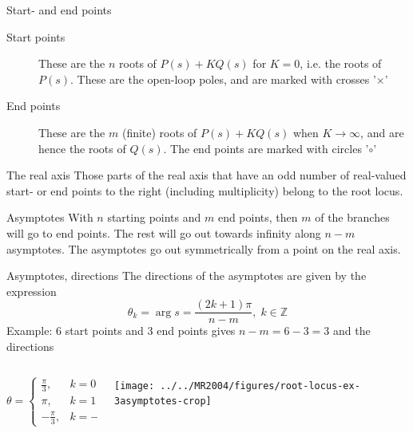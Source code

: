 \documentclass[presentation,aspectratio=169]{beamer}
\begin{document}
\begin{frame}[label={sec:orgf80e036}]{Start- and end points}
\begin{description}
\item[{Start points}] These are the \(n\) roots of \(P(s) + KQ(s)\) for \(K=0\), i.e. the roots of \(P(s)\). These are the open-loop poles, and are marked with crosses '\(\times\)'
\item[{End points}] These are the \(m\) (finite) roots of \(P(s)+KQ(s)\) when \(K\to\infty\), and are hence the roots of \(Q(s)\). The end points are marked with circles '\(\circ\)'
\end{description}
\end{frame}

\begin{frame}[label={sec:org398a233}]{The real axis}
Those parts of the real axis that have an \alert{odd number} of real-valued start- or end points to the right (including multiplicity) belong to the root locus. 
\end{frame}


\begin{frame}[label={sec:org8aa0f2f}]{Asymptotes}
With \(n\) starting points and \(m\) end points, then \(m\) of the branches will go to end points. The rest will go out towards infinity along \(n-m\) asymptotes. The asymptotes go out symmetrically from a point on the real axis. 
\end{frame}


\begin{frame}[label={sec:org1180ef0}]{Asymptotes, directions}
The directions of the asymptotes are given by the expression
\[ \theta_k = \arg s = \frac{(2k+1)\pi}{n-m}, \; k \in \mathbb{Z} \]
Example: 6 start points and 3 end points gives \(n-m = 6-3 = 3\) and the directions

\begin{columns}
\begin{column}{0.35\columnwidth}
\[ \theta = \begin{cases} \frac{\pi}{3}, & k=0\\ \pi, & k=1\\ -\frac{\pi}{3}, & k=-1 \end{cases}. \]
\end{column}

\begin{column}{0.65\columnwidth}
\begin{center}
\texttt{[image: ../../MR2004/figures/root-locus-ex-3asymptotes-crop]}
\end{center}
\end{column}
\end{columns}
\end{frame}
\end{document}
